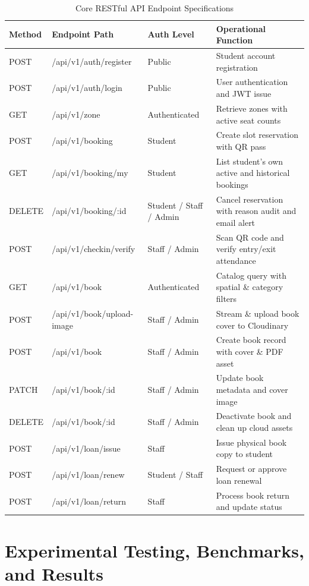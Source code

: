 \begin{table}[H]
\centering
\caption{Core RESTful API Endpoint Specifications}
\label{tab:api_endpoints}
\small
\begin{tabularx}{\textwidth}{>{\ttfamily\arraybackslash}p{1.8cm} >{\ttfamily\arraybackslash}p{4.6cm} >{\centering\arraybackslash}p{2.6cm} >{\raggedright\arraybackslash}X}
\toprule
\textbf{Method} & \textbf{Endpoint Path} & \textbf{Auth Level} & \textbf{Operational Function} \\
\midrule
POST & /api/v1/auth/register & Public & Student account registration \\
POST & /api/v1/auth/login & Public & User authentication and JWT issue \\
GET & /api/v1/zone & Authenticated & Retrieve zones with active seat counts \\
POST & /api/v1/booking & Student & Create slot reservation with QR pass \\
GET & /api/v1/booking/my & Student & List student's own active and historical bookings \\
DELETE & /api/v1/booking/:id & Student / Staff / Admin & Cancel reservation with reason audit and email alert \\
POST & /api/v1/checkin/verify & Staff / Admin & Scan QR code and verify entry/exit attendance \\
GET & /api/v1/book & Authenticated & Catalog query with spatial \& category filters \\
POST & /api/v1/book/upload-image & Staff / Admin & Stream \& upload book cover to Cloudinary \\
POST & /api/v1/book & Staff / Admin & Create book record with cover \& PDF asset \\
PATCH & /api/v1/book/:id & Staff / Admin & Update book metadata and cover image \\
DELETE & /api/v1/book/:id & Staff / Admin & Deactivate book and clean up cloud assets \\
POST & /api/v1/loan/issue & Staff & Issue physical book copy to student \\
POST & /api/v1/loan/renew & Student / Staff & Request or approve loan renewal \\
POST & /api/v1/loan/return & Staff & Process book return and update status \\
\bottomrule
\end{tabularx}
\end{table}

\section{Experimental Testing, Benchmarks, and Results}

